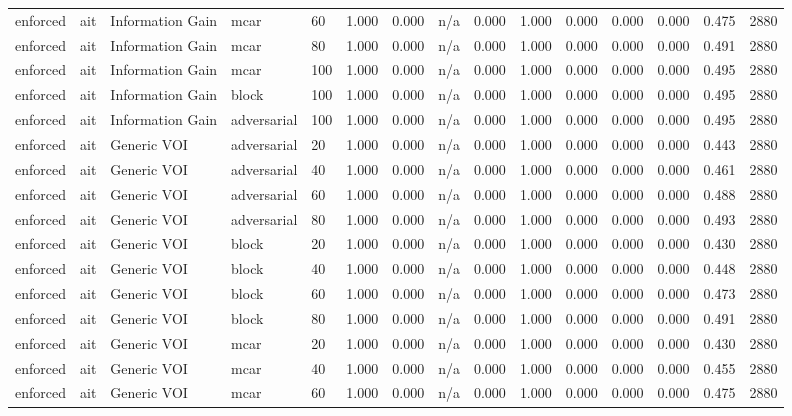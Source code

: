 \begin{table}[!ht]
{\begin{tabular}{lllllllllllllll}
enforced & ait & Information Gain & mcar & 60 & 1.000 & 0.000 & n/a & 0.000 & 1.000 & 0.000 & 0.000 & 0.000 & 0.475 & 2880 \\
enforced & ait & Information Gain & mcar & 80 & 1.000 & 0.000 & n/a & 0.000 & 1.000 & 0.000 & 0.000 & 0.000 & 0.491 & 2880 \\
enforced & ait & Information Gain & mcar & 100 & 1.000 & 0.000 & n/a & 0.000 & 1.000 & 0.000 & 0.000 & 0.000 & 0.495 & 2880 \\
enforced & ait & Information Gain & block & 100 & 1.000 & 0.000 & n/a & 0.000 & 1.000 & 0.000 & 0.000 & 0.000 & 0.495 & 2880 \\
enforced & ait & Information Gain & adversarial & 100 & 1.000 & 0.000 & n/a & 0.000 & 1.000 & 0.000 & 0.000 & 0.000 & 0.495 & 2880 \\
enforced & ait & Generic VOI & adversarial & 20 & 1.000 & 0.000 & n/a & 0.000 & 1.000 & 0.000 & 0.000 & 0.000 & 0.443 & 2880 \\
enforced & ait & Generic VOI & adversarial & 40 & 1.000 & 0.000 & n/a & 0.000 & 1.000 & 0.000 & 0.000 & 0.000 & 0.461 & 2880 \\
enforced & ait & Generic VOI & adversarial & 60 & 1.000 & 0.000 & n/a & 0.000 & 1.000 & 0.000 & 0.000 & 0.000 & 0.488 & 2880 \\
enforced & ait & Generic VOI & adversarial & 80 & 1.000 & 0.000 & n/a & 0.000 & 1.000 & 0.000 & 0.000 & 0.000 & 0.493 & 2880 \\
enforced & ait & Generic VOI & block & 20 & 1.000 & 0.000 & n/a & 0.000 & 1.000 & 0.000 & 0.000 & 0.000 & 0.430 & 2880 \\
enforced & ait & Generic VOI & block & 40 & 1.000 & 0.000 & n/a & 0.000 & 1.000 & 0.000 & 0.000 & 0.000 & 0.448 & 2880 \\
enforced & ait & Generic VOI & block & 60 & 1.000 & 0.000 & n/a & 0.000 & 1.000 & 0.000 & 0.000 & 0.000 & 0.473 & 2880 \\
enforced & ait & Generic VOI & block & 80 & 1.000 & 0.000 & n/a & 0.000 & 1.000 & 0.000 & 0.000 & 0.000 & 0.491 & 2880 \\
enforced & ait & Generic VOI & mcar & 20 & 1.000 & 0.000 & n/a & 0.000 & 1.000 & 0.000 & 0.000 & 0.000 & 0.430 & 2880 \\
enforced & ait & Generic VOI & mcar & 40 & 1.000 & 0.000 & n/a & 0.000 & 1.000 & 0.000 & 0.000 & 0.000 & 0.455 & 2880 \\
enforced & ait & Generic VOI & mcar & 60 & 1.000 & 0.000 & n/a & 0.000 & 1.000 & 0.000 & 0.000 & 0.000 & 0.475 & 2880 \\

\end{tabular}}
\end{table}
